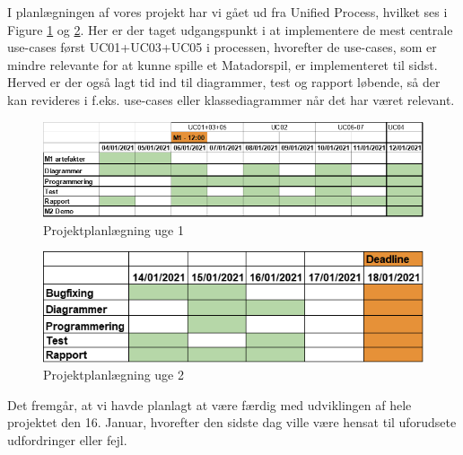 \begin{flushleft}
\doublespacing
I planlægningen af vores projekt har vi gået ud fra Unified Process, hvilket ses i Figure \ref{Projektplanlægning01} og \ref{Projektplanlægning02}. Her er der taget udgangspunkt i at implementere de mest centrale use-cases først UC01+UC03+UC05 i processen, hvorefter de use-cases, som er mindre relevante for at kunne spille et Matadorspil, er implementeret til sidst. Herved er der også lagt tid ind til diagrammer, test og rapport løbende, så der kan revideres i f.eks. use-cases eller klassediagrammer når det har været relevant.
\begin{figure}[htp] %
    \centering
    \includegraphics[width=14cm]{Report/figures/Projektplanlægning/Projektplanlægning_uge01.png}
    \caption{Projektplanlægning uge 1}
    \label{Projektplanlægning01}
\end{figure}

\begin{figure}[htp] %
    \centering
    \includegraphics[width=14cm]{Report/figures/Projektplanlægning/Projektplanlægning_uge02.png}
    \caption{Projektplanlægning uge 2}
    \label{Projektplanlægning02}
\end{figure}

Det fremgår, at vi havde planlagt at være færdig med udviklingen af hele projektet den 16. Januar, hvorefter den sidste dag ville være hensat til uforudsete udfordringer eller fejl.

\end{flushleft}